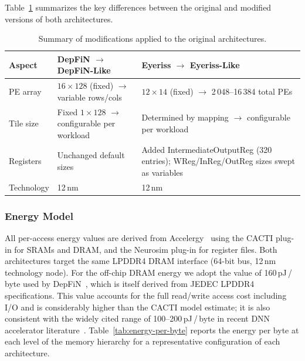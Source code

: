 Table~\ref{tab:modified-arch-comparison} summarizes the key differences
between the original and modified versions of both architectures.

\begin{table}[htbp]
  \centering
  \caption{Summary of modifications applied to the original architectures.}
  \label{tab:modified-arch-comparison}
  \small
  \begin{tabular}{l p{5cm} p{5cm}}
    \toprule
    \textbf{Aspect}
      & \textbf{DepFiN $\to$ DepFiN-Like}
      & \textbf{Eyeriss $\to$ Eyeriss-Like} \\
    \midrule
    PE array
      & $16 \times 128$ (fixed) $\to$ variable rows/cols
      & $12 \times 14$ (fixed) $\to$ 2\,048--16\,384 total PEs \\
    \addlinespace
    Tile size
      & Fixed $1 \times 128$ $\to$ configurable per workload
      & Determined by mapping $\to$ configurable per workload \\
    \addlinespace
    Registers
      & Unchanged default sizes
      & Added IntermediateOutputReg (320 entries);
        WReg/InReg/OutReg sizes swept as variables \\
    \addlinespace
    Technology
      & 12\,nm
      & 12\,nm \\
    \bottomrule
  \end{tabular}
\end{table}

\subsubsection{Energy Model}
\label{sec:energy-model}

All per-access energy values are derived from
Accelergy~\cite{accelergy} using the CACTI plug-in for SRAMs and DRAM,
and the Neurosim plug-in for register files.
Both architectures target the same LPDDR4 DRAM interface (64-bit bus,
12\,nm technology node).
For the off-chip DRAM energy we adopt the value of
160\,pJ\,/\,byte used by DepFiN~\cite{depfin}, which is itself
derived from JEDEC LPDDR4 specifications.
This value accounts for the full read/write access cost including I/O
and is considerably higher than the CACTI model estimate; it is also
consistent with the widely cited range of 100--200\,pJ\,/\,byte in
recent DNN accelerator literature~\cite{eyeriss_jssc}.
Table~\ref{tab:energy-per-byte} reports the energy per byte at each
level of the memory hierarchy for a representative configuration of
each architecture.

